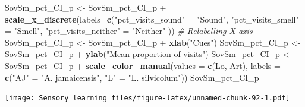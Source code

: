 \documentclass[]{article}
\newenvironment{Shaded}{\begin{snugshade}}{\end{snugshade}}
\newcommand{\KeywordTok}[1]{\textcolor[rgb]{0.13,0.29,0.53}{\textbf{{#1}}}}
\newcommand{\DataTypeTok}[1]{\textcolor[rgb]{0.13,0.29,0.53}{{#1}}}
\newcommand{\StringTok}[1]{\textcolor[rgb]{0.31,0.60,0.02}{{#1}}}
\newcommand{\CommentTok}[1]{\textcolor[rgb]{0.56,0.35,0.01}{\textit{{#1}}}}
\newcommand{\NormalTok}[1]{{#1}}
\begin{document}
\begin{Shaded}
\begin{Highlighting}[]
\NormalTok{SovSm_pct_CI_p <-}\StringTok{ }\NormalTok{SovSm_pct_CI_p +}\StringTok{ }\KeywordTok{scale_x_discrete}\NormalTok{(}\DataTypeTok{labels=}\KeywordTok{c}\NormalTok{(}\StringTok{"pct_visits_sound"} \NormalTok{=}\StringTok{ "Sound"}\NormalTok{, }\StringTok{"pct_visits_smell"} \NormalTok{=}\StringTok{ "Smell"}\NormalTok{,}
                              \StringTok{"pct_visits_neither"} \NormalTok{=}\StringTok{ "Neither"} \NormalTok{))  }\CommentTok{# Relabelling X axis}
\NormalTok{SovSm_pct_CI_p <-}\StringTok{ }\NormalTok{SovSm_pct_CI_p +}\StringTok{ }\KeywordTok{xlab}\NormalTok{(}\StringTok{"Cues"}\NormalTok{)}
\NormalTok{SovSm_pct_CI_p <-}\StringTok{ }\NormalTok{SovSm_pct_CI_p +}\StringTok{ }\KeywordTok{ylab}\NormalTok{(}\StringTok{"Mean proportion of visits"}\NormalTok{)}
\NormalTok{SovSm_pct_CI_p <-}\StringTok{ }\NormalTok{SovSm_pct_CI_p +}\StringTok{  }\KeywordTok{scale_color_manual}\NormalTok{(}\DataTypeTok{values =} \KeywordTok{c}\NormalTok{(Lo, Art), }\DataTypeTok{labels =} \KeywordTok{c}\NormalTok{(}\StringTok{"AJ"} \NormalTok{=}\StringTok{ "A. jamaicensis"}\NormalTok{, }\StringTok{"L"} \NormalTok{=}\StringTok{ "L. silvicolum"}\NormalTok{))}
\NormalTok{SovSm_pct_CI_p                    }
\end{Highlighting}
\end{Shaded}

\texttt{[image: Sensory\_learning\_files/figure-latex/unnamed-chunk-92-1.pdf]}
\end{document}
